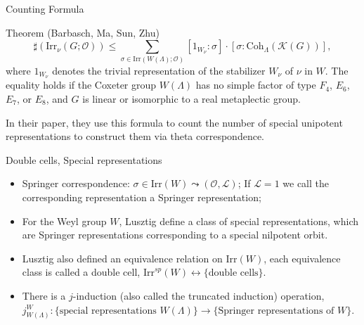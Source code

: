 \documentclass[fleqn,xcolor=dvipsnames]{beamer}
\newcommand{\CK}{{\mathcal {K}}}
\newcommand{\CL}{{\mathcal {L}}}
\newcommand{\CO}{{\mathcal {O}}}
\newcommand{\Irr}{{\mathrm{Irr}}}
\begin{document}
\begin{frame}{Counting Formula}
\begin{block}{Theorem (Barbasch, Ma, Sun, Zhu)}
  \begin{equation*}
        \sharp(\Irr_{\nu}(G;\CO)) \leq \sum\limits_{\sigma \in \Irr(W(\Lambda);\CO)} [1_{W_\nu}:\sigma] \cdot [\sigma:\mathrm{Coh}_{\Lambda}(\CK(G))],
    \end{equation*}
    where $1_{W_\nu}$ denotes the trivial representation of the stabilizer $W_\nu$ of $\nu$ in $W$. The \alert{equality holds} if the Coxeter group $W(\Lambda)$ has no simple factor of type $F_4$, $E_6$, $E_7$, or $E_8$, and $G$ is linear or isomorphic to a real metaplectic group.
\end{block}

\pause In their paper, they use this formula to count the number of special unipotent representations to construct them via theta correspondence.

\end{frame}




\begin{frame}{Double cells, Special representations}
  
\begin{itemize}
  \item Springer correspondence: $\sigma \in \Irr(W) \leadsto (\CO,\CL)$; If $\CL =1$ we call the corresponding representation a Springer representation;
  \pause\item For the Weyl group $W$, Lusztig define a class of \alert{special representations}, which are Springer representations corresponding to a \alert{special nilpotent orbit}.
  \pause\item Lusztig also defined an equivalence relation on $\Irr(W)$, each equivalence class is called a \alert{double cell}, $\Irr^{sp}(W) \leftrightarrow \{ \textrm{double cells} \}$.
  \pause\item There is a \alert{$j$-induction} (also called the truncated induction) operation, $j_{W(\Lambda)}^{W}: \{ \textrm{special representations $W(\Lambda)$}\} \to \{\textrm{Springer representations of $W$} \}$.
\end{itemize}

\end{frame}
\end{document}
